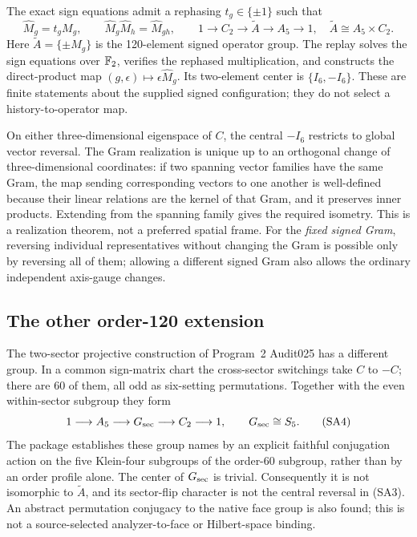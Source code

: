 The exact sign equations admit a rephasing $t_g\in\{\pm1\}$ such that
\begin{equation}
\widehat M_g=t_gM_g,\qquad
\widehat M_g\widehat M_h=\widehat M_{gh},\qquad
1\longrightarrow C_2\longrightarrow\widetilde A
\longrightarrow A_5\longrightarrow1,
\quad \widetilde A\cong A_5\times C_2.
\tag{SA3}\label{eq:signedextension}
\end{equation}
Here $\widetilde A=\{\pm M_g\}$ is the 120-element signed operator group. The replay solves the sign equations over $\mathbb F_2$, verifies the rephased multiplication, and constructs the direct-product map $(g,\epsilon)\mapsto\epsilon\widehat M_g$. Its two-element center is $\{I_6,-I_6\}$. These are finite statements about the supplied signed configuration; they do not select a history-to-operator map.

On either three-dimensional eigenspace of $C$, the central $-I_6$ restricts to global vector reversal. The Gram realization is unique up to an orthogonal change of three-dimensional coordinates: if two spanning vector families have the same Gram, the map sending corresponding vectors to one another is well-defined because their linear relations are the kernel of that Gram, and it preserves inner products. Extending from the spanning family gives the required isometry. This is a realization theorem, not a preferred spatial frame. For the \emph{fixed signed Gram}, reversing individual representatives without changing the Gram is possible only by reversing all of them; allowing a different signed Gram also allows the ordinary independent axis-gauge changes.

\subsection*{The other order-120 extension}
The two-sector projective construction of Program~2 Audit025 has a different group. In a common sign-matrix chart the cross-sector switchings take $C$ to $-C$; there are 60 of them, all odd as six-setting permutations. Together with the even within-sector subgroup they form
\begin{equation}
1\longrightarrow A_5\longrightarrow G_{\rm sec}
\longrightarrow C_2\longrightarrow1,\qquad G_{\rm sec}\cong S_5.
\tag{SA4}\label{eq:sectorextension}
\end{equation}
The package establishes these group names by an explicit faithful conjugation action on the five Klein-four subgroups of the order-60 subgroup, rather than by an order profile alone. The center of $G_{\rm sec}$ is trivial. Consequently it is not isomorphic to $\widetilde A$, and its sector-flip character is not the central reversal in (SA3). An abstract permutation conjugacy to the native face group is also found; this is not a source-selected analyzer-to-face or Hilbert-space binding.

